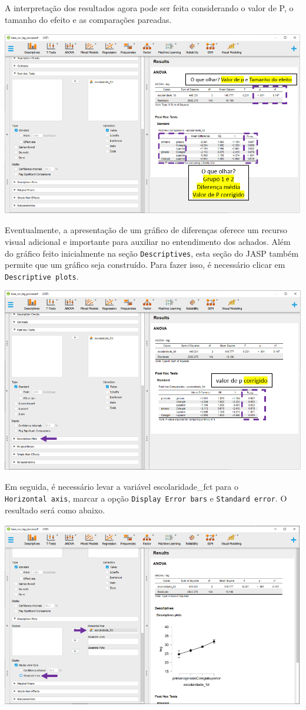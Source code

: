 \documentclass[
]{book}
\begin{document}
A interpretação dos resultados agora pode ser feita considerando o valor de P, o tamanho do efeito e as comparações pareadas.

\includegraphics{./img/cap_anova_posthoc_resultados2.png}

Eventualmente, a apresentação de um gráfico de diferenças oferece um recurso visual adicional e importante para auxiliar no entendimento dos achados. Além do gráfico feito inicialmente na seção \texttt{Descriptives}, esta seção do JASP também permite que um gráfico seja construído. Para fazer isso, é necessário clicar em \texttt{Descriptive\ plots}.

\includegraphics{./img/cap_anova_posthoc_plots.png}

Em seguida, é necessário levar a variável escolaridade\_fct para o \texttt{Horizontal\ axis}, marcar a opção \texttt{Display\ Error\ bars} e \texttt{Standard\ error}. O resultado será como abaixo.

\includegraphics{./img/cap_anova_posthoc_plots2.png}
\end{document}
